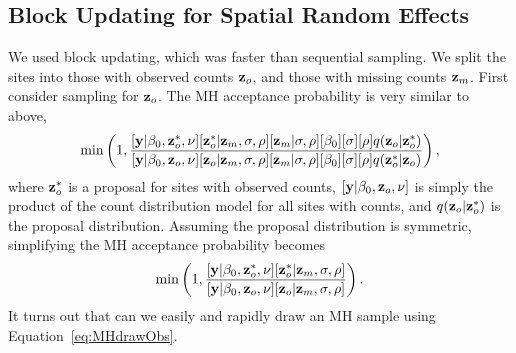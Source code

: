 \documentclass[11pt, titlepage]{article}
\begin{document}
\begin{spacing}{1.9}
\begin{flushleft}
\subsection{Block Updating for Spatial Random Effects}

We used block updating, which was faster than sequential sampling. We split the sites into those with observed counts $\mathbf{z}_{o}$, and those with missing counts $\mathbf{z}_{m}$. First consider sampling for $\mathbf{z}_{o}$. The MH acceptance probability is very similar to above,
\begin{equation} \label{eq:MHblock}
\min\left(1,\frac{[\mathbf{y}|\beta_{0},\mathbf{z}^{*}_{o},\nu][\mathbf{z}^{*}_{o}|\mathbf{z}_{m},\sigma,\rho][\mathbf{z}_{m}|\sigma,\rho][\beta_{0}] [\sigma] [\rho]q(\mathbf{z}_{o}|\mathbf{z}_{o}^{*})}
	{[\mathbf{y}|\beta_{0},\mathbf{z}_{o},\nu][\mathbf{z}_{o}|\mathbf{z}_{m},\sigma,\rho][\mathbf{z}_{m}|\sigma,\rho][\beta_{0}] [\sigma] [\rho]q(\mathbf{z}_{o}^{*}|\mathbf{z}_{o})}\right),
\end{equation}
where $\mathbf{z}^{*}_{o}$ is a proposal for sites with observed counts, $[\mathbf{y}|\beta_{0},\mathbf{z}_{o},\nu]$ is simply the product of the count distribution model for all sites with counts, and $q(\mathbf{z}_{o}|\mathbf{z}_{o}^{*})$ is the proposal distribution. Assuming the proposal distribution is symmetric, simplifying the MH acceptance probability becomes
\begin{equation}\label{eq:MHdrawObs}
\min\left(1,\frac{[\mathbf{y}|\beta_{0},\mathbf{z}^{*}_{o},\nu][\mathbf{z}^{*}_{o}|\mathbf{z}_{m},\sigma,\rho]}
	{[\mathbf{y}|\beta_{0},\mathbf{z}_{o},\nu][\mathbf{z}_{o}|\mathbf{z}_{m},\sigma,\rho]}\right).
\end{equation}
It turns out that can we easily and rapidly draw an MH sample using Equation~\eqref{eq:MHdrawObs}.  


\end{flushleft}
\end{spacing}
\end{document}
